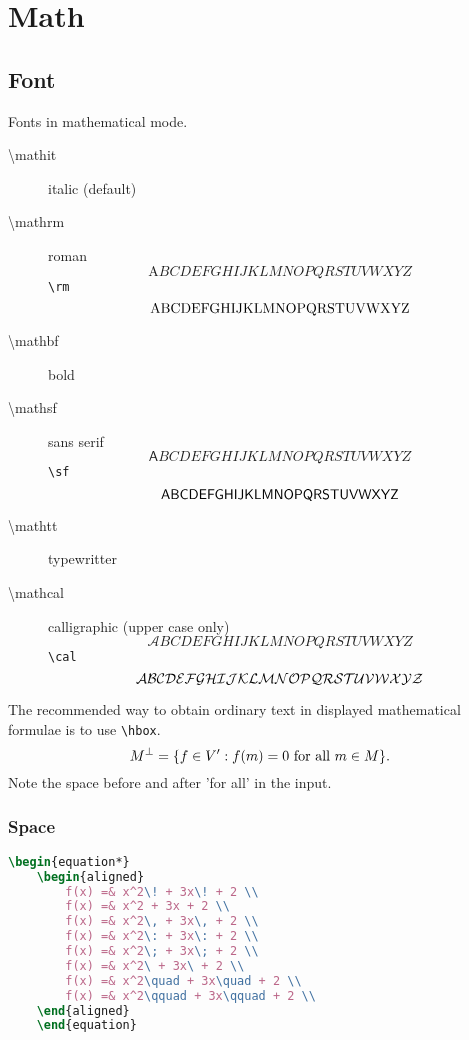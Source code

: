\chapter{Math}

\section{Font}
Fonts in mathematical mode.
\begin{description}
    \item [\textbackslash{}mathit]  italic (default)
    \item [\textbackslash{}mathrm]  roman
	\[
	    \mathrm ABCDEFGHIJKLMNOPQRSTUVWXYZ
	    \]
	\verb|\rm|
	\[
	    \rm ABCDEFGHIJKLMNOPQRSTUVWXYZ
	    \]
    \item [\textbackslash{}mathbf]  bold
    \item [\textbackslash{}mathsf]  sans serif
	\[
	    \mathsf ABCDEFGHIJKLMNOPQRSTUVWXYZ
	    \]
	\verb|\sf|
	\[
	    \sf ABCDEFGHIJKLMNOPQRSTUVWXYZ
	    \]
    \item [\textbackslash{}mathtt]  typewritter
    \item [\textbackslash{}mathcal] calligraphic (upper case only)
	\[
	    \mathcal ABCDEFGHIJKLMNOPQRSTUVWXYZ
	    \]
	\verb|\cal|
	\[
	    \cal ABCDEFGHIJKLMNOPQRSTUVWXYZ
	    \]
\end{description}
The recommended way to obtain ordinary text in displayed mathematical 
formulae is to use \verb|\hbox|.
\[
    M^\bot = \{ f \in V' : f(m) = 0 \hbox{ for all } m \in M \}.
    \]
Note the space before and after 'for all' in the input.

\subsection{Space}
\begin{lstlisting}[language=TeX]
    \begin{equation*}
	\begin{aligned}
	    f(x) =& x^2\! + 3x\! + 2 \\
	    f(x) =& x^2 + 3x + 2 \\
	    f(x) =& x^2\, + 3x\, + 2 \\
	    f(x) =& x^2\: + 3x\: + 2 \\
	    f(x) =& x^2\; + 3x\; + 2 \\
	    f(x) =& x^2\ + 3x\ + 2 \\
	    f(x) =& x^2\quad + 3x\quad + 2 \\
	    f(x) =& x^2\qquad + 3x\qquad + 2 \\
	\end{aligned}
    \end{equation}
\end{lstlisting}

